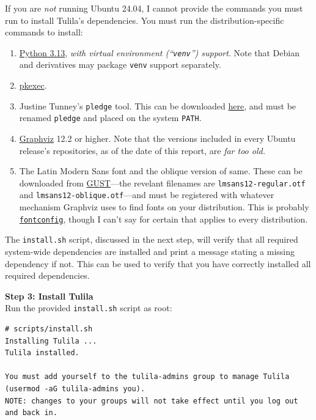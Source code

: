 \documentclass[12pt]{article}
\begin{document}
If you are \textit{not} running Ubuntu 24.04, I cannot provide the commands you must run to install Tulila's dependencies. You must run the distribution-specific commands to install:
\begin{enumerate}
  \item \href{https://peps.python.org/pep-0719/}{Python 3.13}, \textit{with virtual environment (``\texttt{venv}'') support}. Note that Debian and derivatives may package \texttt{venv} support separately.
  \item \href{https://www.freedesktop.org/software/polkit/docs/latest/pkexec.1.html}{pkexec}.
  \item Justine Tunney's \texttt{pledge} tool. This can be downloaded \href{https://justine.lol/pledge/}{here}, and must be renamed \texttt{pledge} and placed on the system \texttt{PATH}.
  \item \href{https://graphviz.org/}{Graphviz} 12.2 or higher. Note that the versions included in every Ubuntu release's repositories, as of the date of this report, are \textit{far too old.}
  \item The Latin Modern Sans font and the oblique version of same. These can be downloaded from \href{https://www.gust.org.pl/projects/e-foundry/latin-modern}{GUST}---the revelant filenames are \texttt{lmsans12-regular.otf} and \texttt{lmsans12-oblique.otf}---and must be registered with whatever mechanism Graphviz uses to find fonts on your distribution. This is probably \href{https://www.freedesktop.org/wiki/Software/fontconfig/}{\texttt{fontconfig}}, though I can't say for certain that applies to every distribution.
\end{enumerate}

The \texttt{install.sh} script, discussed in the next step, will verify that all required system-wide dependencies are installed and print a message stating a missing dependency if not. This can be used to verify that you have correctly installed all required dependencies.

\bigskip
\textbf{Step 3: Install Tulila}\\
Run the provided \texttt{install.sh} script as root:

\begin{Verbatim}
# scripts/install.sh
Installing Tulila ...
Tulila installed.

You must add yourself to the tulila-admins group to manage Tulila (usermod -aG tulila-admins you).
NOTE: changes to your groups will not take effect until you log out and back in.
\end{Verbatim}
\end{document}

